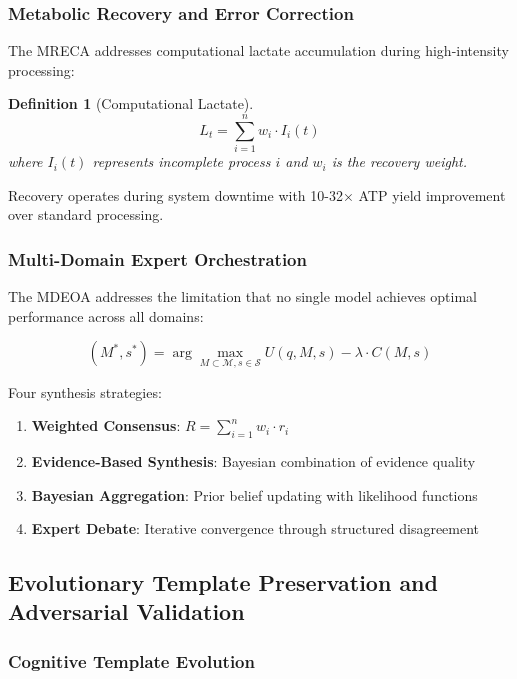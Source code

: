 \documentclass[12pt,a4paper]{article}
\newtheorem{definition}{Definition}
\begin{document}
\subsubsection{Metabolic Recovery and Error Correction}

The MRECA addresses computational lactate accumulation during high-intensity processing:

\begin{definition}[Computational Lactate]
\begin{equation}
L_t = \sum_{i=1}^{n} w_i \cdot I_i(t)
\end{equation}
where $I_i(t)$ represents incomplete process $i$ and $w_i$ is the recovery weight.
\end{definition}

Recovery operates during system downtime with 10-32× ATP yield improvement over standard processing.

\subsubsection{Multi-Domain Expert Orchestration}

The MDEOA addresses the limitation that no single model achieves optimal performance across all domains:

\begin{equation}
(M^*, s^*) = \arg\max_{M \subset \mathcal{M}, s \in \mathcal{S}} U(q, M, s) - \lambda \cdot C(M, s)
\end{equation}

Four synthesis strategies:
\begin{enumerate}
\item \textbf{Weighted Consensus}: $R = \sum_{i=1}^{n} w_i \cdot r_i$
\item \textbf{Evidence-Based Synthesis}: Bayesian combination of evidence quality
\item \textbf{Bayesian Aggregation}: Prior belief updating with likelihood functions
\item \textbf{Expert Debate}: Iterative convergence through structured disagreement
\end{enumerate}

\subsection{Evolutionary Template Preservation and Adversarial Validation}

\subsubsection{Cognitive Template Evolution}
\end{document}
